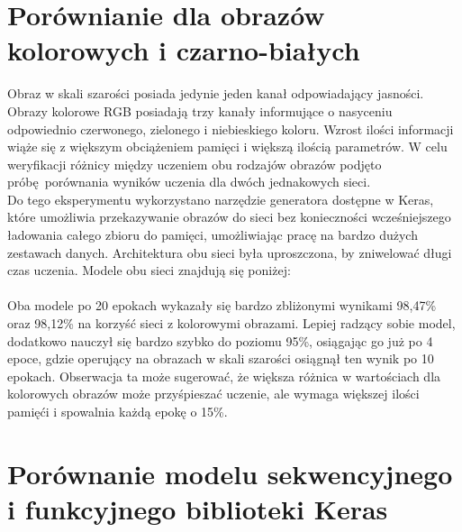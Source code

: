 \section{Porównianie dla obrazów kolorowych i czarno-białych}
Obraz w skali szarości posiada jedynie jeden kanał odpowiadający jasności. Obrazy kolorowe RGB
posiadają trzy kanały informujące o nasyceniu odpowiednio czerwonego, zielonego i niebieskiego koloru.
Wzrost ilości informacji wiąże się z większym obciążeniem pamięci i większą ilością parametrów.
W celu weryfikacji różnicy między uczeniem obu rodzajów obrazów podjęto próbę porównania wyników
uczenia dla dwóch jednakowych sieci.\\
Do tego eksperymentu wykorzystano narzędzie generatora dostępne w Keras, które umożliwia
przekazywanie obrazów do sieci bez konieczności wcześniejszego ładowania całego zbioru
do pamięci, umożliwiając pracę na bardzo dużych zestawach danych. Architektura obu
sieci była uproszczona, by zniwelować długi czas uczenia. Modele obu sieci znajdują się poniżej:\\\\
Oba modele po 20 epokach wykazały się bardzo zbliżonymi wynikami 98,47\% oraz 98,12\%
na korzyść sieci z kolorowymi obrazami. Lepiej radzący sobie model, dodatkowo nauczył
się bardzo szybko do poziomu 95\%, osiągając go już po 4 epoce, gdzie operujący na
obrazach w skali szarości osiągnął ten wynik po 10 epokach. Obserwacja ta może sugerować,
że większa różnica w wartościach dla kolorowych obrazów może przyśpieszać uczenie, ale
wymaga większej ilości pamięći i spowalnia każdą epokę o 15\%.

\section{Porównanie modelu sekwencyjnego i funkcyjnego biblioteki Keras}
